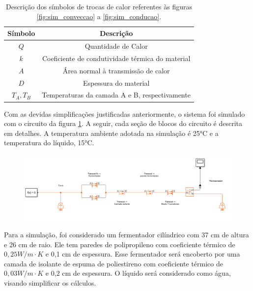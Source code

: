 \begin{table}[H]
    \begin{center}
        \begin{tabular}{ |c|c| } 
            \hline
            Símbolo & Descrição \\
            \hline
            \(Q\) & Quantidade de Calor \\
            \hline
            \(k\) & Coeficiente de condutividade térmica do material \\
            \hline
            \(A\) & Área normal à transmissão de calor \\
            \hline
            \(D\) & Espessura do material \\
            \hline
            \(T_A, T_B\) & Temperaturas da camada A e B, respectivamente \\
            \hline
        \end{tabular}
        \caption{\label{tab:legenda_blocos} Descrição dos símbolos de trocas de calor referentes às figuras \ref{fig:sim_conveccao} a \ref{fig:sim_conducao}.}
    \end{center}
\end{table}


Com as devidas simplificações justificadas anteriormente, o sistema foi simulado com o circuito da figura \ref{fig:sim_circuito}. A seguir, cada seção de blocos do circuito é descrita em detalhes. A temperatura ambiente adotada na simulação é 25°C e a temperatura do líquido, 15°C.

\begin{figure}[H]
    \centering
    \includegraphics[scale=0.39]{figuras/projeto/controle/sim_circuito.png}
    \label{fig:sim_circuito}
\end{figure}


Para a simulação, foi considerado um fermentador cilíndrico com 37 cm de altura e 26 cm de raio. Ele tem paredes de polipropileno com coeficiente térmico de \(0,25 W / m \cdot K\)  e 0,1 cm de espessura. Esse fermentador será encoberto por uma camada de isolante de espuma de poliestireno com coeficiente térmico de  \(0,03 W / m \cdot K\) e 0,2 cm de espessura. O líquido será considerado como água, visando simplificar os cálculos. 



